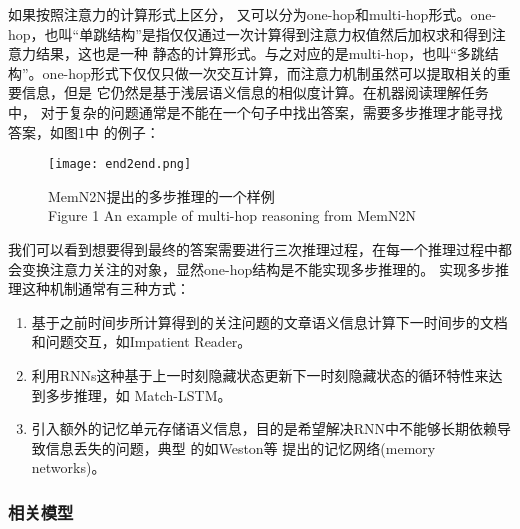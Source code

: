 如果按照注意力的计算形式上区分，
又可以分为one-hop和multi-hop形式。one-hop，也叫“单跳结构”是指仅仅通过一次计算得到注意力权值然后加权求和得到注意力结果，这也是一种
静态的计算形式。与之对应的是multi-hop，也叫“多跳结构”。one-hop形式下仅仅只做一次交互计算，而注意力机制虽然可以提取相关的重要信息，但是
它仍然是基于浅层语义信息的相似度计算。在机器阅读理解任务中，
对于复杂的问题通常是不能在一个句子中找出答案，需要多步推理才能寻找答案，如图1中
的例子：
\begin{figure}[ht]
    \centering
    \texttt{[image: end2end.png]}
    \caption{MemN2N提出的多步推理的一个样例 \\ Figure 1 An example of multi-hop reasoning from MemN2N}
\end{figure}
我们可以看到想要得到最终的答案需要进行三次推理过程，在每一个推理过程中都会变换注意力关注的对象，显然one-hop结构是不能实现多步推理的。
实现多步推理这种机制通常有三种方式：
\begin{enumerate}
\item 基于之前时间步所计算得到的关注问题的文章语义信息计算下一时间步的文档和问题交互，如Impatient Reader。
\item 利用RNNs这种基于上一时刻隐藏状态更新下一时刻隐藏状态的循环特性来达到多步推理，如
Match-LSTM。
\item 引入额外的记忆单元存储语义信息，目的是希望解决RNN中不能够长期依赖导致信息丢失的问题，典型
的如Weston等
提出的记忆网络(memory networks)。
\end{enumerate}


\subsubsection{相关模型}

